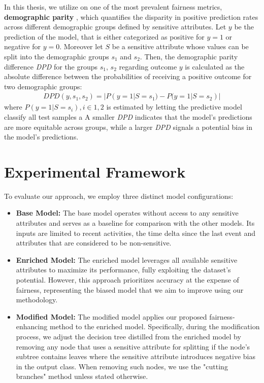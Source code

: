 In this thesis, we utilize on one of the most prevalent fairness metrics, \textbf{demographic parity} \cite{demographic_parity},
which quantifies the disparity in positive prediction rates across different demographic groups defined by sensitive attributes. 
Let $y$ be the prediction of the model, that is either categorized as positive for $y = 1$ or negative for $y = 0$.
Moreover let $S$ be a sensitive attribute whose values can be split into the demographic groups $s_1$ and $s_2$.
Then, the demographic parity difference \textit{DPD} for the groups $s_1$, $s_2$ regarding outcome $y$
is calculated as the absolute difference between the probabilities of receiving a positive outcome for two demographic groups:
\begin{align}
  \textit{DPD}(y, s_1, s_2) = |P(y = 1 |S = s_1) - P(y = 1 |S = s_2)|
\end{align}
where $P(y = 1 |S = s_i), i \in {1,2}$ is estimated by letting the predictive model classify
all test samples a
A smaller \textit{DPD} indicates that the model's predictions are more equitable across groups,
while a larger \textit{DPD} signals a potential bias in the model's predictions.



\section{Experimental Framework}
To evaluate our approach, we employ three distinct model configurations:
\begin{itemize}
    \item \textbf{Base Model:}
        The base model operates without access to any sensitive attributes and serves as a baseline for comparison with the other models.
        Its inputs are limited to recent activities, the time delta since the last event
        and attributes that are considered to be non-sensitive.
    \item \textbf{Enriched Model:}
        The enriched model leverages all available sensitive attributes to maximize its performance,
        fully exploiting the dataset's potential.
        However, this approach prioritizes accuracy at the expense of fairness,
        representing the biased model that we aim to improve using our methodology.
    \item \textbf{Modified Model:}
        The modified model applies our proposed fairness-enhancing method to the enriched model.
        Specifically, during the modification process,
        we adjust the decision tree distilled from the enriched model by removing any node
        that uses a sensitive attribute for splitting if the node's subtree contains leaves
        where the sensitive attribute introduces negative bias in the output class.
        When removing such nodes, we use the "cutting branches" method unless stated otherwise.
\end{itemize}

